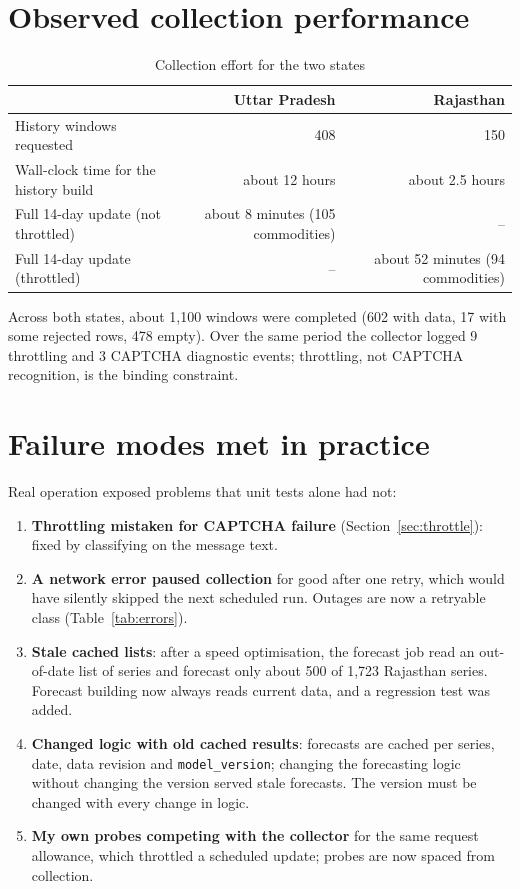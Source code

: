 \documentclass[12pt,a4paper,oneside]{report}
\numberwithin{equation}{chapter}
\numberwithin{figure}{chapter}
\numberwithin{table}{chapter}
\theoremstyle{definition}
\begin{document}
\section{Observed collection performance}\label{sec:perf}
\begin{table}[H]
\centering
\caption{Collection effort for the two states}
\label{tab:effort}
\small
\begin{tabular}{@{}lrr@{}}
\toprule
& Uttar Pradesh & Rajasthan \\
\midrule
History windows requested & 408 & 150 \\
Wall-clock time for the history build & about 12 hours & about 2.5 hours \\
Full 14-day update (not throttled) & about 8 minutes (105 commodities) & -- \\
Full 14-day update (throttled) & -- & about 52 minutes (94 commodities) \\
\bottomrule
\end{tabular}
\end{table}
Across both states, about 1,100 windows were completed (602 with data, 17 with some rejected rows, 478 empty). Over the same period the collector logged 9 throttling and 3 CAPTCHA diagnostic events; throttling, not CAPTCHA recognition, is the binding constraint.

\section{Failure modes met in practice}\label{sec:failures}
Real operation exposed problems that unit tests alone had not:
\begin{enumerate}
  \item \textbf{Throttling mistaken for CAPTCHA failure} (Section~\ref{sec:throttle}): fixed by classifying on the message text.
  \item \textbf{A network error paused collection} for good after one retry, which would have silently skipped the next scheduled run. Outages are now a retryable class (Table~\ref{tab:errors}).
  \item \textbf{Stale cached lists}: after a speed optimisation, the forecast job read an out-of-date list of series and forecast only about 500 of 1,723 Rajasthan series. Forecast building now always reads current data, and a regression test was added.
  \item \textbf{Changed logic with old cached results}: forecasts are cached per series, date, data revision and \texttt{model\_version}; changing the forecasting logic without changing the version served stale forecasts. The version must be changed with every change in logic.
  \item \textbf{My own probes competing with the collector} for the same request allowance, which throttled a scheduled update; probes are now spaced from collection.
\end{enumerate}
\end{document}
